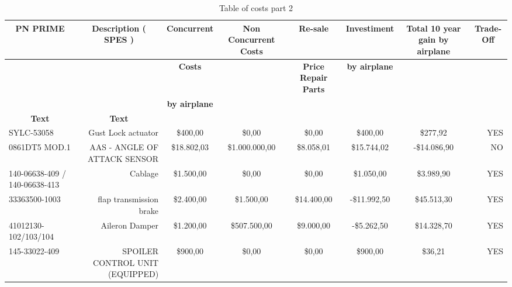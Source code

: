 \begin{table}[htbp]
  \centering
  \caption{Table of costs part 2}
    \begin{tabular}{rrccrrcr}
    \toprule
    \multicolumn{1}{c}{\multirow{3}[2]{*}{\textbf{PN PRIME}}} & \multicolumn{1}{c}{\multirow{3}[2]{*}{\textbf{Description ( SPES )}}} & \textbf{Concurrent} & \multirow{3}[2]{*}{\textbf{Non Concurrent Costs}} & \multicolumn{1}{c}{\textbf{Re-sale}} & \multicolumn{1}{c}{\textbf{Investiment}} & \multirow{3}[2]{*}{\textbf{Total 10 year gain by airplane}} & \multicolumn{1}{c}{\multirow{3}[2]{*}{\textbf{Trade-Off}}} \\
    \midrule
    \multicolumn{1}{c}{} & \multicolumn{1}{c}{} & \textbf{Costs} &       & \multicolumn{1}{c}{\textbf{Price Repair Parts}} & \multicolumn{1}{c}{\textbf{by airplane}} &       & \multicolumn{1}{c}{} \\
    \multicolumn{1}{c}{} & \multicolumn{1}{c}{} & \textbf{by airplane} &       &       &       &       & \multicolumn{1}{c}{} \\
    \multicolumn{1}{c}{\textbf{Text}} & \multicolumn{1}{c}{\textbf{Text}} & \textbf{} & \textbf{} & \multicolumn{1}{c}{\textbf{}} & \multicolumn{1}{c}{\textbf{}} & \textbf{} & \multicolumn{1}{c}{\textbf{}} \\
    \multicolumn{1}{l}{SYLC-53058} & Gust Lock actuator & \$400,00 & \$0,00 & \multicolumn{1}{c}{\$0,00} & \multicolumn{1}{c}{\$400,00} & \$277,92 & YES \\
    \multicolumn{1}{l}{0861DT5 MOD.1} & AAS - ANGLE OF ATTACK SENSOR & \$18.802,03 & \$1.000.000,00 & \multicolumn{1}{c}{\$8.058,01} & \multicolumn{1}{c}{\$15.744,02} & -\$14.086,90 & NO \\
    \multicolumn{1}{l}{140-06638-409 / 140-06638-413} & Cablage & \$1.500,00 & \$0,00 & \multicolumn{1}{c}{\$0,00} & \multicolumn{1}{c}{\$1.050,00} & \$3.989,90 & YES \\
    \multicolumn{1}{l}{33363500-1003} & flap transmission brake & \$2.400,00 & \$1.500,00 & \multicolumn{1}{c}{\$14.400,00} & \multicolumn{1}{c}{-\$11.992,50} & \$45.513,30 & YES \\
    \multicolumn{1}{l}{41012130-102/103/104} & Aileron Damper & \$1.200,00 & \$507.500,00 & \multicolumn{1}{c}{\$9.000,00} & \multicolumn{1}{c}{-\$5.262,50} & \$14.328,70 & YES \\
    \multicolumn{1}{l}{145-33022-409} & SPOILER CONTROL UNIT (EQUIPPED) & \$900,00 & \$0,00 & \multicolumn{1}{c}{\$0,00} & \multicolumn{1}{c}{\$900,00} & \$36,21 & YES \\

\end{tabular}
\end{table}
